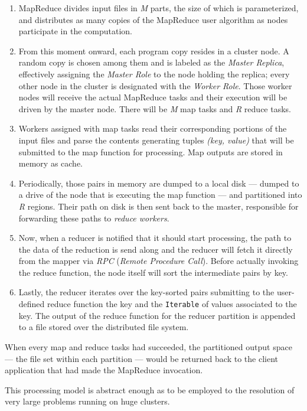 \begin{enumerate}
 \item MapReduce divides input files in \emph{M} parts, the size of which is parameterized, and distributes as many copies of the MapReduce user algorithm as nodes participate in the computation.
 \item From this moment onward, each program copy resides in a cluster node. A random copy is chosen among them and is labeled as the \emph{Master Replica}, effectively assigning the \emph{Master Role} to the node holding the replica; every other node in the cluster is designated with the \emph{Worker Role}. Those worker nodes will receive the actual MapReduce tasks and their execution will be driven by the master node. There will be \emph{M} map tasks and \emph{R} reduce tasks.
 \item Workers assigned with map tasks read their corresponding portions of the input files and parse the contents generating tuples \emph{(key, value)} that will be submitted to the map function for processing. Map outputs are stored in memory as cache.
 \item Periodically, those pairs in memory are dumped to a local disk --- dumped to a drive of the node that is executing the map function --- and partitioned into \emph{R} regions. Their path on disk is then sent back to the master, responsible for forwarding these paths to \emph{reduce workers}.
 \item Now, when a reducer is notified that it should start processing, the path to the data of the reduction is send along and the reducer will fetch it directly from the mapper via \emph{RPC} (\emph{Remote Procedure Call}). Before actually invoking the reduce function, the node itself will sort the intermediate pairs by key.
 \item Lastly, the reducer iterates over the key-sorted pairs submitting to the user-defined reduce function the key and the \texttt{Iterable} of values associated to the key. The output of the reduce function for the reducer partition is appended to a file stored over the distributed file system.
\end{enumerate}

When every map and reduce tasks had succeeded, the partitioned output space --- the file set within each partition --- would be returned back to the client application that had made the MapReduce invocation.

This processing model is abstract enough as to be employed to the resolution of very large problems running on huge clusters.

